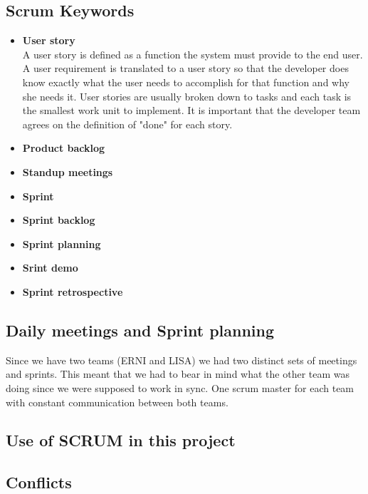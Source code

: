 \subsection{Scrum Keywords}
\begin{itemize}
\item{\textbf{User story}}\\
A user story is defined as a function the system must provide to the end user.
A user requirement is translated to a user story so that the developer does know exactly
what the user needs to accomplish for that function and why she needs it. User stories are usually
broken down to tasks and each task is the smallest work unit to implement.
It is important that the developer team agrees on the definition of "done" for each story.

\item{\textbf{Product backlog}}\\

\item{\textbf{Standup meetings}}\\
\item{\textbf{Sprint}}\\
\item{\textbf{Sprint backlog}}\\
\item{\textbf{Sprint planning}}\\
\item{\textbf{Srint demo}}\\
\item{\textbf{Sprint retrospective}}\\

\end{itemize}
\subsection{Daily meetings and Sprint planning}

Since we have two teams (ERNI and LISA) we had two distinct sets of meetings and sprints. This meant that we had to bear in mind what the other team was doing since we were supposed to work in sync. One scrum master for each team with constant communication between both teams. 

\subsection{Use of SCRUM in this project}

\subsection{Conflicts}
